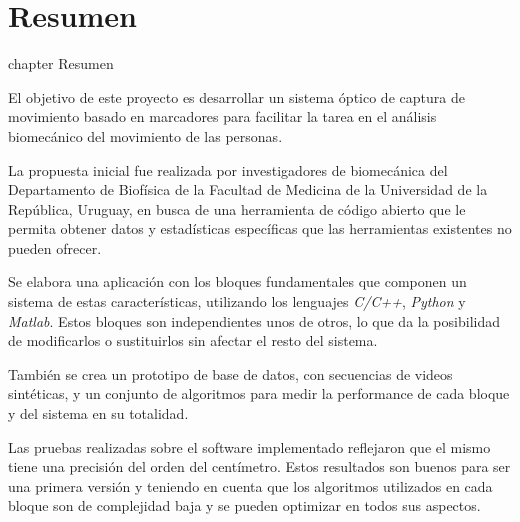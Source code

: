 \chapter*{Resumen}
 {chapter} {Resumen}%

El objetivo de este proyecto es desarrollar un sistema óptico de captura de movimiento basado en marcadores para facilitar la tarea en el análisis biomecánico del movimiento de las personas.

\vspace{3 mm}

 La propuesta inicial fue realizada por investigadores de biomecánica del Departamento de Biofísica de la Facultad de Medicina de la Universidad de la República, Uruguay, en busca de una herramienta de código abierto que le permita obtener datos y estadísticas específicas que las herramientas existentes no pueden ofrecer.

\vspace{3 mm}

Se elabora una aplicación con los bloques fundamentales que componen un sistema de estas características, utilizando los lenguajes \emph{C/C++}, \emph{Python} y \emph{Matlab}. Estos bloques son independientes unos de otros, lo que da la posibilidad de modificarlos o sustituirlos sin afectar el resto del sistema.

\vspace{3 mm}

También se crea un prototipo de base de datos, con secuencias de videos sintéticas, y un conjunto de algoritmos para medir la performance de cada bloque y del sistema en su totalidad.

\vspace{3 mm}

Las pruebas realizadas sobre el software implementado reflejaron que el mismo tiene una precisión del orden del centímetro. Estos resultados son buenos para ser una primera versión y teniendo en cuenta que los algoritmos utilizados en cada bloque son de complejidad baja y se pueden optimizar en todos sus aspectos.
